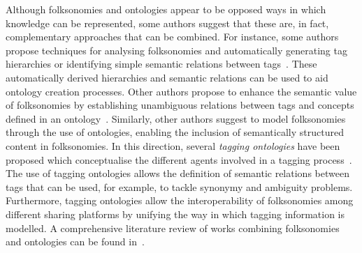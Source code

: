 Although folksonomies and ontologies appear to be opposed ways in which knowledge can be represented, some authors suggest that these are, in fact, complementary approaches that can be combined. %
For instance, some authors propose techniques for analysing folksonomies and automatically generating tag hierarchies or identifying simple semantic relations between tags~\citep{Merholz2004,halpin2006,Heymann2006a,Mika2007a,Hwang2007}. These automatically derived hierarchies and semantic relations can be used to aid ontology creation processes.
Other authors propose to enhance the semantic value of folksonomies by establishing unambiguous relations between tags and concepts defined in an ontology~\citep{Good2007,Passant2007a}.
Similarly, other authors suggest to model folksonomies through the use of ontologies, enabling the inclusion of semantically structured content in folksonomies. In this direction, several \emph{tagging ontologies} have been proposed which conceptualise the different agents involved in a tagging process~\citep{Newman2005,Limpens2007,Echarte2007,Passant2008a,Kim2010,Ding2010a}.
The use of tagging ontologies allows the definition of semantic relations between tags that can be used, for example, to tackle synonymy and ambiguity problems. Furthermore, tagging ontologies allow the interoperability of folksonomies among different sharing platforms by unifying the way in which tagging information is modelled.
A comprehensive literature review of works combining folksonomies and ontologies can be found in~\cite{limpens2009linking}.

